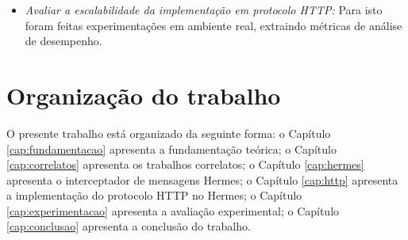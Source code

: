 \begin{itemize}
\item \textit{Avaliar a escalabilidade da implementação em protocolo HTTP:}
Para isto foram feitas experimentações em ambiente real, extraindo métricas de análise de desempenho.


\end{itemize}

\section{Organização do trabalho}

O presente trabalho está organizado da seguinte forma: o Capítulo \ref{cap:fundamentacao} apresenta a fundamentação teórica; o Capítulo \ref{cap:correlatos} apresenta os trabalhos correlatos; o Capítulo \ref{cap:hermes} apresenta o interceptador de mensagens Hermes; o Capítulo \ref{cap:http} apresenta a implementação do protocolo HTTP no Hermes; o Capítulo \ref{cap:experimentacao} apresenta a avaliação experimental; o Capítulo \ref{cap:conclusao} apresenta a conclusão do trabalho.
